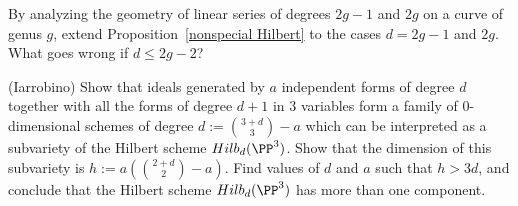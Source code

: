 \begin{exercise}
By analyzing the geometry of linear series of degrees $2g-1$ and $2g$ on a curve of genus $g$, extend Proposition~\ref{nonspecial Hilbert} to the cases $d = 2g-1$ and $2g$. What goes wrong if $d \leq 2g-2$?
\end{exercise}


\begin{exercise}\label{bigger component}(Iarrobino)
Show that ideals generated by $a$ independent forms of degree $d$ together with all the forms of degree $d+1$ in 3 variables
form a family of 0-dimensional schemes of degree $d:={3+d\choose 3} -a$ which can be interpreted as a subvariety
of the Hilbert scheme $Hilb_d(\PP^3)$. Show that the dimension of this subvariety is $h := a({2+d\choose 2}-a)$. Find values of
$d$ and $a$ such that $h>3d$, and conclude that the Hilbert scheme $Hilb_d(\PP^3)$ has more than one component.
\end{exercise}




